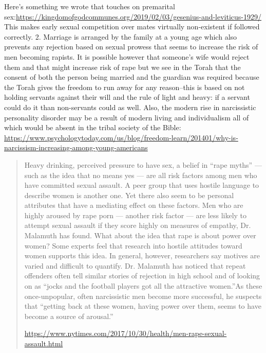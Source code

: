 \documentclass[11pt]{article}
\begin{document}
Here’s something we wrote that touches on premarital sex:\newline \url{https://kingdomofgodcommunes.org/2019/02/03/gesenius-and-leviticus-1929/} This makes early sexual competition over mates virtually non-existent if followed correctly. 2. Marriage is arranged by the family at a young age which also prevents any rejection based on sexual prowess that seems to increase the risk of men becoming rapists. It is possible however that someone’s wife would reject them and that might increase risk of rape but we see in the Torah that the consent of both the person being married and the guardian was required because the Torah gives the freedom to run away for any reason--this is based on not holding servants against their will and the rule of light and heavy: if a servant could do it than non-servants could as well. Also, the modern rise in narcissistic personality disorder may be a result of modern living and individualism all of which would be absent in the tribal society of the Bible: \url{https://www.psychologytoday.com/us/blog/freedom-learn/201401/why-is-narcissism-increasing-among-young-americans}

\begin{quote}
Heavy drinking, perceived pressure to have sex, a belief in “rape myths” — such as the idea that no means yes — are all risk factors among men who have committed sexual assault. A peer group that uses hostile language to describe women is another one.
Yet there also seem to be personal attributes that have a mediating effect on these factors. Men who are highly aroused by rape porn — another risk factor — are less likely to attempt sexual assault if they score highly on measures of empathy, Dr. Malamuth has found. What about the idea that rape is about power over women? Some experts feel that research into hostile attitudes toward women supports this idea. In general, however, researchers say motives are varied and difficult to quantify. Dr. Malamuth has noticed that repeat offenders often tell similar stories of rejection in high school and of looking on as “jocks and the football players got all the attractive women.”As these once-unpopular, often narcissistic men become more successful, he suspects that “getting back at these women, having power over them, seems to have become a source of arousal.”

\url{https://www.nytimes.com/2017/10/30/health/men-rape-sexual-assault.html}
\end{quote}
\end{document}
